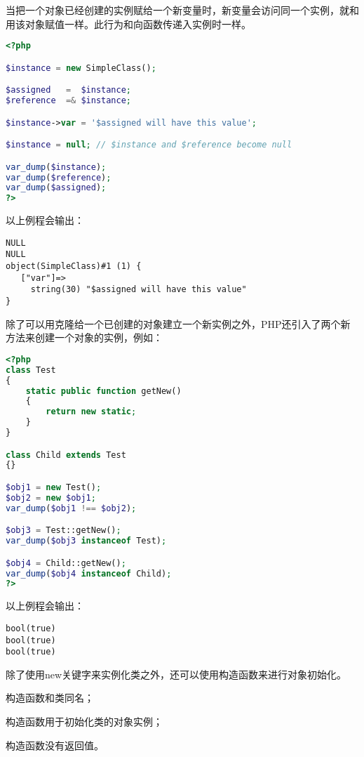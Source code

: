 当把一个对象已经创建的实例赋给一个新变量时，新变量会访问同一个实例，就和用该对象赋值一样。此行为和向函数传递入实例时一样。


\begin{lstlisting}[language=PHP]
<?php

$instance = new SimpleClass();

$assigned   =  $instance;
$reference  =& $instance;

$instance->var = '$assigned will have this value';

$instance = null; // $instance and $reference become null

var_dump($instance);
var_dump($reference);
var_dump($assigned);
?>
\end{lstlisting}

以上例程会输出：

\begin{verbatim}
NULL
NULL
object(SimpleClass)#1 (1) {
   ["var"]=>
     string(30) "$assigned will have this value"
}
\end{verbatim}

除了可以用克隆给一个已创建的对象建立一个新实例之外，PHP还引入了两个新方法来创建一个对象的实例，例如：





\begin{lstlisting}[language=PHP]
<?php
class Test
{
    static public function getNew()
    {
        return new static;
    }
}

class Child extends Test
{}

$obj1 = new Test();
$obj2 = new $obj1;
var_dump($obj1 !== $obj2);

$obj3 = Test::getNew();
var_dump($obj3 instanceof Test);

$obj4 = Child::getNew();
var_dump($obj4 instanceof Child);
?>
\end{lstlisting}

以上例程会输出：

\begin{verbatim}
bool(true)
bool(true)
bool(true)
\end{verbatim}

除了使用new关键字来实例化类之外，还可以使用构造函数来进行对象初始化。

\begin{compactitem}
\item 构造函数和类同名；
\item 构造函数用于初始化类的对象实例；
\item 构造函数没有返回值。
\end{compactitem}


